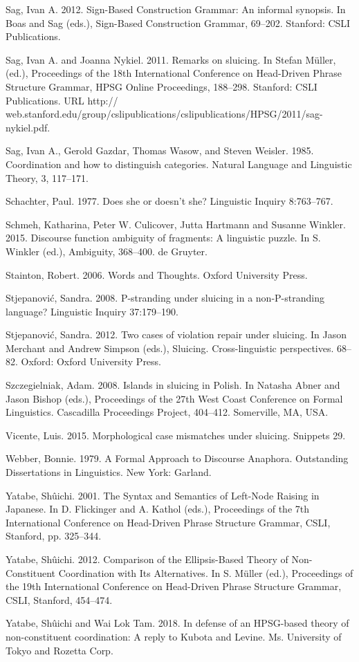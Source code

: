 \documentclass[output=paper]{langsci/langscibook}
\begin{document}
\begin{description}
\item Sag, Ivan A. 2012. Sign-Based Construction Grammar: An informal synopsis. In Boas and Sag (eds.), Sign-Based Construction Grammar, 69--202. Stanford: CSLI Publications.
\item Sag, Ivan A. and Joanna Nykiel. 2011. Remarks on sluicing. In Stefan M\"{u}ller, (ed.),
Proceedings of the 18th International Conference on Head-Driven Phrase Structure
Grammar, HPSG Online Proceedings, 188--298. Stanford: CSLI Publications. URL http://
web.stanford.edu/group/cslipublications/cslipublications/HPSG/2011/sag-nykiel.pdf.
\item Sag, Ivan A., Gerold Gazdar, Thomas Wasow, and Steven Weisler. 1985. Coordination and how to distinguish categories.
Natural Language and Linguistic Theory, 3, 117--171.
\item Schachter, Paul. 1977. Does she or doesn't she? Linguistic Inquiry 8:763--767.
\item Schmeh, Katharina, Peter W. Culicover, Jutta Hartmann and Susanne Winkler. 2015. Discourse function ambiguity of fragments: A linguistic puzzle. In S. Winkler (ed.), Ambiguity, 368--400. de Gruyter.
\item Stainton, Robert. 2006. Words and Thoughts. Oxford University Press.
\item Stjepanovi\'{c}, Sandra. 2008. P-stranding under sluicing in a non-P-stranding language? Linguistic Inquiry 37:179--190.
\item Stjepanovi\'{c}, Sandra. 2012. Two cases of violation repair under sluicing. In Jason Merchant and Andrew Simpson (eds.), Sluicing. Cross-linguistic perspectives. 68--82. Oxford: Oxford University Press.
\item Szczegielniak, Adam. 2008. Islands in sluicing in Polish. In Natasha Abner and Jason Bishop (eds.), Proceedings of the 27th West Coast Conference on Formal Linguistics. Cascadilla Proceedings Project, 404--412. Somerville, MA, USA.
\item Vicente, Luis. 2015. Morphological case mismatches under sluicing. Snippets 29.
\item Webber, Bonnie. 1979. A Formal Approach to Discourse Anaphora. Outstanding
Dissertations in Linguistics. New York: Garland.
\item Yatabe, Sh\^{u}ichi. 2001. The Syntax and Semantics of Left-Node Raising in Japanese. In
D. Flickinger and A. Kathol (eds.), Proceedings of the 7th International Conference
on Head-Driven Phrase Structure Grammar, CSLI, Stanford, pp. 325--344.
\item Yatabe, Sh\^{u}ichi. 2012. Comparison of the Ellipsis-Based Theory of Non-Constituent Coordination with Its Alternatives. In S. M\"{u}ller (ed.), Proceedings of the 19th International
Conference on Head-Driven Phrase Structure Grammar, CSLI, Stanford, 454--474.
\item  Yatabe, Sh\^{u}ichi and Wai Lok Tam. 2018. In defense of an HPSG-based theory of
non-constituent coordination: A reply to Kubota and Levine. Ms. University of Tokyo and Rozetta Corp.
\end{description}

 
\printbibliography[heading=subbibliography,notkeyword=this] 
\end{document}
